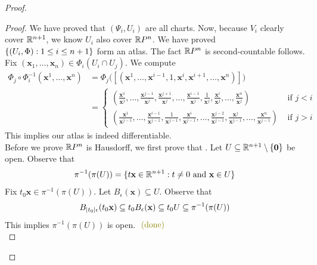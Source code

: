 \documentclass{report}
\begin{document}
\begin{proof}
\begin{proof}
We have proved that $(\Psi_i,U_i)$ are all charts. Now, because $V_i$ clearly cover $\mathbb{R}^{n+1}$, we know $U_i$ also cover  $\mathbb{R} P^n$. We have proved $\{ (U_i,\Phi):1\leq i\leq n+1 \}$ form an atlas. The fact $\mathbb{R} P^n$ is second-countable follows. \\

Fix $(\textbf{x}_1,\dots ,\textbf{x}_{n})\in \Phi_i(U_i\cap U_j)$. We compute 
\begin{align*}
\Phi_j\circ \Phi_i^{-1} (\textbf{x}^1,\dots ,\textbf{x}^{n} )&=\Phi_j \Big( [(\textbf{x}^1,\dots ,\textbf{x}^{i-1},1,\textbf{x}^i,\textbf{x}^{i+1},\dots, \textbf{x}^n)] \Big) \\
&= \begin{cases}
  (\frac{\textbf{x}^1}{\textbf{x}^j},\dots , \frac{\textbf{x}^{j-1}}{\textbf{x}^j},\frac{\textbf{x}^{j+1}}{\textbf{x}^j},\dots ,\frac{\textbf{x}^{i-1}}{\textbf{x}^j},\frac{1}{\textbf{x}^j},\frac{\textbf{x}^i}{\textbf{x}^j},\dots ,\frac{\textbf{x}^n}{\textbf{x}^j})& \text{ if $j<i$ }\\
  (\frac{\textbf{x}^1}{\textbf{x}^{j-1}},\dots , \frac{\textbf{x}^{i-1}}{\textbf{x}^{j-1}},\frac{1}{\textbf{x}^{j-1}},\frac{\textbf{x}^i}{\textbf{x}^{j-1}},\dots , \frac{\textbf{x}^{j-2}}{\textbf{x}^{j-1}}, \frac{\textbf{x}^j}{\textbf{x}^{j-1}}, \dots,\frac{\textbf{x}^n}{\textbf{x}^{j-1}})& \text{ if $j>i$ }
\end{cases}
\end{align*}
This implies our atlas is indeed differentiable. \\

Before we prove $\mathbb{R} P^n$ is Hausdorff, we first prove that  . Let $U\subseteq \mathbb{R}^{n+1}\setminus \{ \textbf{0} \}$ be open. Observe that 
\begin{align*}
\pi^{-1}(\pi(U))= \{ t\textbf{x}\in\mathbb{R}^{n+1}:t\neq 0\text{ and }\textbf{x}\in U \}
\end{align*}
Fix $t_0\textbf{x}\in \pi^{-1}(\pi (U))$. Let $B_\epsilon (\textbf{x})\subseteq U$. Observe that
\begin{align*}
B_{\left|t_0\right|\epsilon }(t_0\textbf{x})\subseteq t_0B_\epsilon (\textbf{x})\subseteq t_0U\subseteq \pi^{-1}(\pi (U))
\end{align*}
This implies $\pi ^{-1}(\pi (U))$ is open.  $\odone$ \\


\end{proof}
\end{proof}
\end{document}

